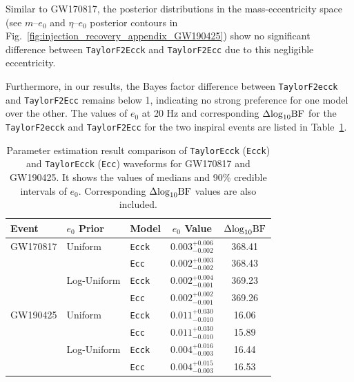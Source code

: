 \documentclass[aps,prd,twocolumn,superscriptaddress,groupedaddress,nofootinbib,showpacs,eqsecnum,useAms]{revtex4-2}
\begin{document}
  Similar to GW170817, the posterior distributions in the mass-eccentricity space (see $m$--$e_0$ and $\eta$--$e_0$ posterior contours in Fig.~\ref{fig:injection_recovery_appendix_GW190425}) show no significant difference between \texttt{TaylorF2Ecck} and \texttt{TaylorF2Ecc} due to this negligible eccentricity. 
  
  Furthermore, in our results, the Bayes factor difference between \texttt{TaylorF2ecck} and \texttt{TaylorF2Ecc} remains below 1, indicating no strong preference for one model over the other. 
  The values of $e_0$ at 20 Hz and corresponding $\Delta{\rm log}_{10}{\rm BF}$ for the \texttt{TaylorF2ecck} and \texttt{TaylorF2Ecc} for the two inspiral events are listed in Table~\ref{tab:e0_waveform_comparison}.
\begingroup
\renewcommand{\arraystretch}{1.5} %
\begin{center}
\begin{table}[ht!]
\begin{tabular}{lllcc}
\hline\hline
Event     & $e_0$ Prior       & Model & $e_0$ Value& $\Delta{\rm log}_{10}{\rm BF}$  \\
\hline
GW170817  & Uniform     & \texttt{Ecck}  & $0.003^{+0.006}_{-0.002}$ & 368.41      \\
          &             & \texttt{Ecc}   & $0.002^{+0.003}_{-0.002}$ & 368.43              \\
          & Log-Uniform & \texttt{Ecck}  & $0.002^{+0.004}_{-0.001}$ & 369.23     \\
          &             & \texttt{Ecc}   & $0.002^{+0.002}_{-0.001}$ & 369.26              \\
\hline
GW190425  & Uniform     & \texttt{Ecck}  & $0.011^{+0.030}_{-0.010}$ & 16.06      \\
          &             & \texttt{Ecc}   & $0.011^{+0.030}_{-0.010}$ & 15.89              \\
          & Log-Uniform & \texttt{Ecck}  & $0.004^{+0.016}_{-0.003}$ & 16.44     \\
          &             & \texttt{Ecc}   & $0.004^{+0.015}_{-0.003}$ & 16.53              \\
\hline\hline
\end{tabular}
\caption{Parameter estimation result comparison of \texttt{TaylorEcck} (\texttt{Ecck}) and \texttt{TaylorEcck} (\texttt{Ecc}) waveforms for GW170817 and GW190425. It shows the values of medians and 90\% credible intervals of $e_0$. Corresponding $\Delta{\rm log}_{10}{\rm BF}$ values are also included.}
\label{tab:e0_waveform_comparison}
\end{table}
\end{center}
\end{document}
